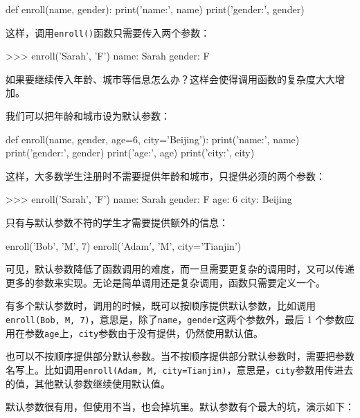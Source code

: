 \begin{pythoncode}
def enroll(name, gender):
    print('name:', name)
    print('gender:', gender)
\end{pythoncode}

这样，调用\texttt{enroll()}函数只需要传入两个参数：

\begin{pythoncode}
>>> enroll('Sarah', 'F')
name: Sarah
gender: F
\end{pythoncode}

如果要继续传入年龄、城市等信息怎么办？这样会使得调用函数的复杂度大大增加。

我们可以把年龄和城市设为默认参数：

\begin{pythoncode}
def enroll(name, gender, age=6, city='Beijing'):
    print('name:', name)
    print('gender:', gender)
    print('age:', age)
    print('city:', city)
\end{pythoncode}

这样，大多数学生注册时不需要提供年龄和城市，只提供必须的两个参数：

\begin{pythoncode}
>>> enroll('Sarah', 'F')
name: Sarah
gender: F
age: 6
city: Beijing
\end{pythoncode}

只有与默认参数不符的学生才需要提供额外的信息：

\begin{pythoncode}
enroll('Bob', 'M', 7)
enroll('Adam', 'M', city='Tianjin')
\end{pythoncode}

可见，默认参数降低了函数调用的难度，而一旦需要更复杂的调用时，又可以传递更多的参数来实现。无论是简单调用还是复杂调用，函数只需要定义一个。

有多个默认参数时，调用的时候，既可以按顺序提供默认参数，比如调用\texttt{enroll(\textquotesingle{}Bob\textquotesingle{},\ \textquotesingle{}M\textquotesingle{},\ 7)}，意思是，除了\texttt{name}，\texttt{gender}这两个参数外，最后
1
个参数应用在参数\texttt{age}上，\texttt{city}参数由于没有提供，仍然使用默认值。

也可以不按顺序提供部分默认参数。当不按顺序提供部分默认参数时，需要把参数名写上。比如调用\texttt{enroll(\textquotesingle{}Adam\textquotesingle{},\ \textquotesingle{}M\textquotesingle{},\ city=\textquotesingle{}Tianjin\textquotesingle{})}，意思是，\texttt{city}参数用传进去的值，其他默认参数继续使用默认值。

默认参数很有用，但使用不当，也会掉坑里。默认参数有个最大的坑，演示如下：

